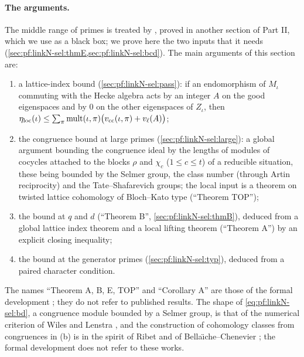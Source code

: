 \paragraph{The arguments.}
The middle range of primes is treated by , proved in another section of
Part II, which we use as a black box; we prove here the two inputs that it needs (\cref{sec:pf:linkN-sel:thmE,sec:pf:linkN-sel:bcd}). The main arguments of this section are:
\begin{enumerate}[label=(\alph*)]
\item a lattice-index bound (\cref{sec:pf:linkN-sel:pass}): if an endomorphism of $M_\iota$ commuting with the Hecke algebra acts
by an integer $A$ on the good eigenspaces and by $0$ on the other eigenspaces of $Z_\iota$, then
$\eta_{\mathrm{loc}}(\iota)\le\sum_\pi\mathrm{mult}(\iota,\pi)\bigl(v_{\mathrm{cc}}(\iota,\pi)+v_\ell(A)\bigr)$;
\item the congruence bound at large primes (\cref{sec:pf:linkN-sel:large}): a global argument bounding the congruence ideal by the
lengths of modules of cocycles attached to the blocks $\rho$ and $\chi_c$ ($1\le c\le t$) of a reducible situation, these being
bounded by the Selmer group, the class number (through Artin reciprocity) and the Tate--Shafarevich groups; the local input is a
theorem on twisted lattice cohomology of Bloch--Kato type (``Theorem TOP'');
\item the bound at $q$ and $d$ (``Theorem B'', \cref{sec:pf:linkN-sel:thmB}), deduced from a global lattice index theorem and a
local lifting theorem (``Theorem A'') by an explicit closing inequality;
\item the bound at the generator primes (\cref{sec:pf:linkN-sel:typ}), deduced from a paired character condition.
\end{enumerate}
The names ``Theorem A, B, E, TOP'' and ``Corollary A'' are those of the formal development \cite{LeanSource2026}; they do not refer
to published results. The shape of \eqref{eq:pf:linkN-sel:bd}, a congruence module bounded by a Selmer group, is that of the
numerical criterion of Wiles and Lenstra \cite{Wiles1995,Lenstra1995}, and the construction of cohomology classes from congruences in
(b) is in the spirit of Ribet \cite{Ribet1976} and of Bella{\"\i}che--Chenevier \cite{BellaicheChenevier2009}; the formal development
does not refer to these works.

